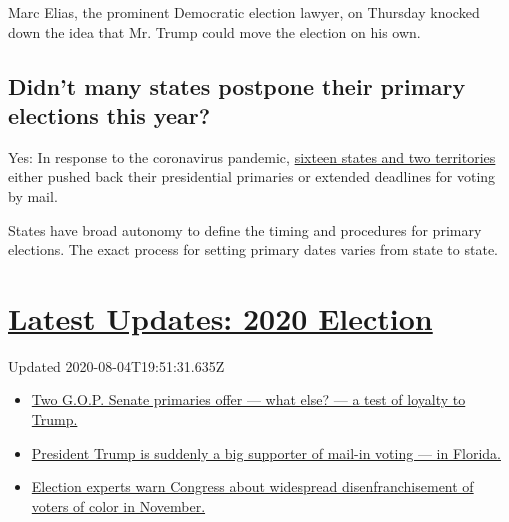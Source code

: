 Marc Elias, the prominent Democratic election lawyer, on Thursday
knocked down the idea that Mr. Trump could move the election on his own.

\hypertarget{didnt-many-states-postpone-their-primary-elections-this-year}{%
\subsection{Didn't many states postpone their primary elections this
year?}\label{didnt-many-states-postpone-their-primary-elections-this-year}}

Yes: In response to the coronavirus pandemic,
\href{https://www.nytimes3xbfgragh.onion/article/2020-campaign-primary-calendar-coronavirus.html}{sixteen
states and two territories} either pushed back their presidential
primaries or extended deadlines for voting by mail.

States have broad autonomy to define the timing and procedures for
primary elections. The exact process for setting primary dates varies
from state to state.

\hypertarget{latest-updates-2020-election}{%
\section{\texorpdfstring{\href{https://www.nytimes3xbfgragh.onion/2020/08/04/us/elections/primary-election-michigan-arizona-kansas.html?action=click\&pgtype=Article\&state=default\&region=MAIN_CONTENT_1\&context=storylines_live_updates}{Latest
Updates: 2020
Election}}{Latest Updates: 2020 Election}}\label{latest-updates-2020-election}}

Updated 2020-08-04T19:51:31.635Z

\begin{itemize}
\tightlist
\item
  \href{https://www.nytimes3xbfgragh.onion/2020/08/04/us/elections/primary-election-michigan-arizona-kansas.html?action=click\&pgtype=Article\&state=default\&region=MAIN_CONTENT_1\&context=storylines_live_updates\#link-3924dd44}{Two
  G.O.P. Senate primaries offer --- what else? --- a test of loyalty to
  Trump.}
\item
  \href{https://www.nytimes3xbfgragh.onion/2020/08/04/us/elections/primary-election-michigan-arizona-kansas.html?action=click\&pgtype=Article\&state=default\&region=MAIN_CONTENT_1\&context=storylines_live_updates\#link-32b39e33}{President
  Trump is suddenly a big supporter of mail-in voting --- in Florida.}
\item
  \href{https://www.nytimes3xbfgragh.onion/2020/08/04/us/elections/primary-election-michigan-arizona-kansas.html?action=click\&pgtype=Article\&state=default\&region=MAIN_CONTENT_1\&context=storylines_live_updates\#link-6d019753}{Election
  experts warn Congress about widespread disenfranchisement of voters of
  color in November.}
\end{itemize}

